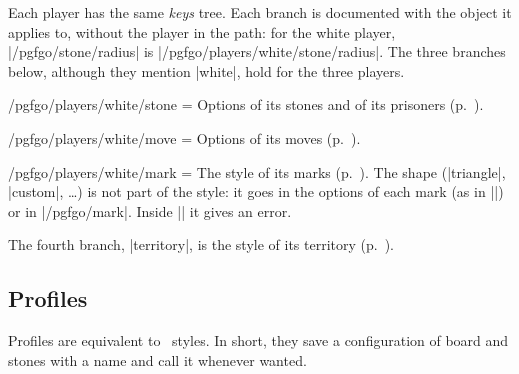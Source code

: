 \label{subsec:jugadores}Each player has the same \emph{keys} tree. Each branch is documented with the object it applies to, without the player in the path: for the white player, |/pgfgo/stone/radius| is |/pgfgo/players/white/stone/radius|. The three branches below, although they mention |white|, hold for the three players.

\begin{key}{/pgfgo/players/white/stone = }
	Options of its stones and of its prisoners (p.~\pageref{sec:piedras}).
\end{key}

\begin{key}{/pgfgo/players/white/move = }
	Options of its moves (p.~\pageref{subsec:movimientos}).
\end{key}

\begin{key}{/pgfgo/players/white/mark = }
	The style of its marks (p.~\pageref{sec:marcas}). The shape (|triangle|, |custom|, \dots) is not part of the style: it goes in the options of each mark (as in ||) or in |/pgfgo/mark|. Inside || it gives an error.
\end{key}

The fourth branch, |territory|, is the style of its territory (p.~\pageref{subsec:territorio}).


\subsection{Profiles}
\label{subsec:perfiles}

Profiles are equivalent to \tikzname\ styles. In short, they save a configuration of board and stones with a name and call it whenever wanted.

